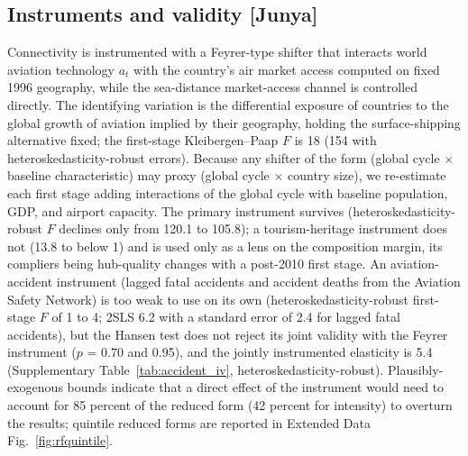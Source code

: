 \documentclass[12pt]{article}
\begin{document}
\subsection*{Instruments and validity [Junya]}
Connectivity is instrumented with a Feyrer-type shifter that interacts
world aviation technology $a_t$ with the country's air market access
computed on fixed 1996 geography, while the sea-distance market-access
channel is controlled directly. The identifying variation is the
differential exposure of countries to the global growth of aviation implied
by their geography, holding the surface-shipping alternative fixed; the
first-stage Kleibergen--Paap $F$ is 18 (154 with heteroskedasticity-robust
errors). Because any shifter of the form
(global cycle $\times$ baseline characteristic) may proxy (global cycle
$\times$ country size), we re-estimate each first stage adding interactions
of the global cycle with baseline population, GDP, and airport capacity.
The primary instrument survives (heteroskedasticity-robust $F$ declines
only from 120.1 to 105.8);
a tourism-heritage instrument does not (13.8 to below 1) and is used only
as a lens on the composition margin, its compliers being hub-quality
changes with a post-2010 first stage. An aviation-accident instrument
(lagged fatal accidents and accident deaths from the Aviation Safety
Network) is too weak to use on its own (heteroskedasticity-robust
first-stage $F$ of 1 to 4; 2SLS 6.2 with a standard error of 2.4 for
lagged fatal accidents), but the Hansen test does not reject its joint
validity with the Feyrer instrument ($p$ = 0.70 and 0.95), and the jointly
instrumented elasticity is 5.4 (Supplementary
Table~\ref{tab:accident_iv}, heteroskedasticity-robust). Plausibly-exogenous bounds indicate that a direct
effect of the instrument would need to account for 85 percent of the
reduced form (42 percent for intensity) to overturn the results; quintile
reduced forms are reported in Extended Data Fig.~\ref{fig:rfquintile}.
\end{document}
